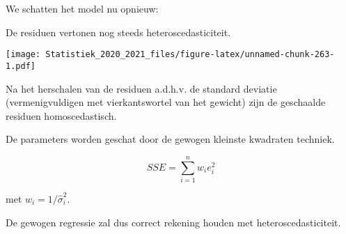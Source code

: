 \documentclass[
  12pt,dutch,coursenotes]{book}
\newenvironment{Shaded}{\begin{snugshade}}{\end{snugshade}}
\newcommand{\DataTypeTok}[1]{\textcolor[rgb]{0.13,0.29,0.53}{#1}}
\newcommand{\DecValTok}[1]{\textcolor[rgb]{0.00,0.00,0.81}{#1}}
\newcommand{\KeywordTok}[1]{\textcolor[rgb]{0.13,0.29,0.53}{\textbf{#1}}}
\newcommand{\NormalTok}[1]{#1}
\newcommand{\OperatorTok}[1]{\textcolor[rgb]{0.81,0.36,0.00}{\textbf{#1}}}
\newcommand{\StringTok}[1]{\textcolor[rgb]{0.31,0.60,0.02}{#1}}
\theoremstyle{definition}
\theoremstyle{definition}
\theoremstyle{definition}
\theoremstyle{remark}
\begin{document}
\begin{Shaded}
\end{Shaded}

We schatten het model nu opnieuw:

\begin{Shaded}
\end{Shaded}

De residuen vertonen nog steeds heteroscedasticiteit.

\begin{Shaded}
\end{Shaded}

\texttt{[image: Statistiek\_2020\_2021\_files/figure-latex/unnamed-chunk-263-1.pdf]}

Na het herschalen van de residuen a.d.h.v. de standard deviatie (vermenigvuldigen met vierkantswortel van het gewicht) zijn de geschaalde residuen homoscedastisch.

De parameters worden geschat door de gewogen kleinste kwadraten techniek.

\[
SSE = \sum\limits_{i=1}^n w_i e_i^2
\]

met \(w_i = 1/\hat \sigma^2_i\).

De gewogen regressie zal dus correct rekening houden met heteroscedasticiteit.
\end{document}
